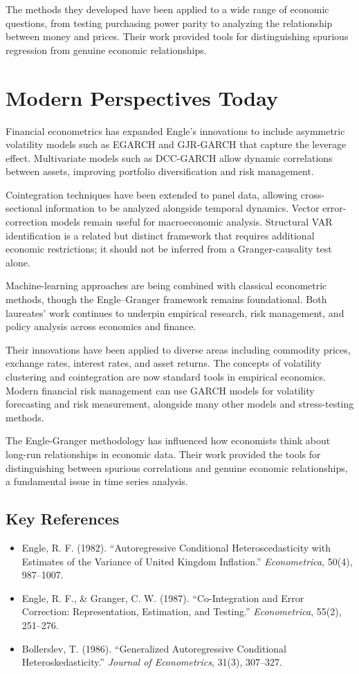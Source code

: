 The methods they developed have been applied to a wide range of economic
questions, from testing purchasing power parity to analyzing the relationship
between money and prices. Their work provided tools for distinguishing
spurious regression from genuine economic relationships.

\section{Modern Perspectives Today}
Financial econometrics has expanded Engle's innovations to include asymmetric
volatility models such as EGARCH and GJR-GARCH that capture the leverage
effect. Multivariate models such as DCC-GARCH allow dynamic correlations
between assets, improving portfolio diversification and risk management.

Cointegration techniques have been extended to panel data, allowing
cross-sectional information to be analyzed alongside temporal dynamics. Vector
error-correction models remain useful for macroeconomic analysis. Structural VAR
identification is a related but distinct framework that requires additional
economic restrictions; it should not be inferred from a Granger-causality test
alone.

Machine-learning approaches are being combined with classical econometric
methods, though the Engle--Granger framework remains foundational. Both
laureates' work continues to underpin empirical research, risk management,
and policy analysis across economics and finance.

Their innovations have been applied to diverse areas including commodity
prices, exchange rates, interest rates, and asset returns. The concepts
of volatility clustering and cointegration are now standard tools in
empirical economics. Modern financial risk management can use GARCH models for
volatility forecasting and risk measurement, alongside many other models and
stress-testing methods.

The Engle-Granger methodology has influenced how economists think about
long-run relationships in economic data. Their work provided the tools
for distinguishing between spurious correlations and genuine economic
relationships, a fundamental issue in time series analysis.

\subsection*{Key References}
\begin{itemize}
    \item Engle, R. F. (1982). ``Autoregressive Conditional Heteroscedasticity with Estimates of the Variance of United Kingdom Inflation.'' \textit{Econometrica}, 50(4), 987--1007.
    \item Engle, R. F., \& Granger, C. W. (1987). ``Co-Integration and Error Correction: Representation, Estimation, and Testing.'' \textit{Econometrica}, 55(2), 251--276.
    \item Bollerslev, T. (1986). ``Generalized Autoregressive Conditional Heteroskedasticity.'' \textit{Journal of Econometrics}, 31(3), 307--327.
\end{itemize}

